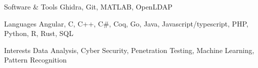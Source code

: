 
\begin{cvskills}
  \cvskill
    {Software \& Tools}
    {Ghidra, Git, MATLAB, OpenLDAP}

  \cvskill
    {Languages}
    {Angular, C, C++, C\#, Coq, Go, Java, Javascript/typescript, PHP, Python, R, Rust, SQL}

  \cvskill
    {Interests}
    {Data Analysis, Cyber Security, Penetration Testing, Machine Learning, Pattern Recognition}
\end{cvskills}
